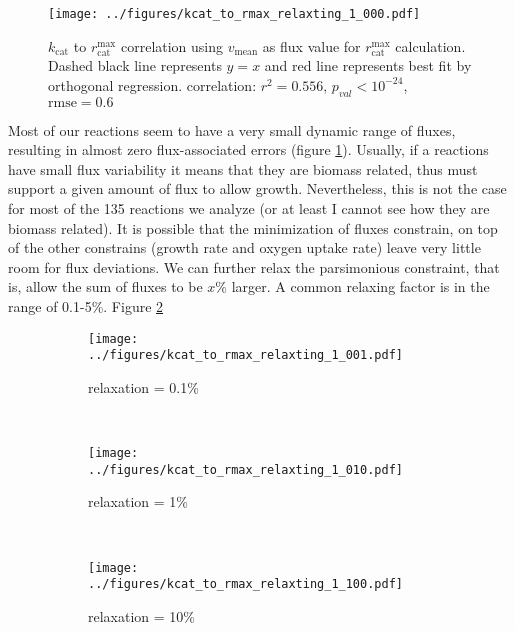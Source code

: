 \documentclass{article}
\newcommand{\kcat}{$k_\mathrm{cat}$ }
\newcommand{\rmax}{$r_\mathrm{cat}^\mathrm{max}$ }
\begin{document}
\begin{figure}
	\center
	\texttt{[image: ../figures/kcat\_to\_rmax\_relaxting\_1\_000.pdf]}
	\caption{\kcat to \rmax correlation using $v_\mathrm{mean}$ as flux value for \rmax calculation. Dashed black line 	represents $y=x$ and red line represents best fit by orthogonal regression. correlation: $r^2 = 0.556$, $p_{val} < 10^{-24}$, $\mathrm{rmse} = 0.6$}
	\label{fig:pFVA}
\end{figure}

Most of our reactions seem to have a very small dynamic range of fluxes, resulting in almost zero flux-associated errors (figure \ref{fig:pFVA}). Usually, if a reactions have small flux variability it means that they are biomass related, thus must support a given amount of flux to allow growth. Nevertheless, this is not the case for most of the 135 reactions we analyze (or at least I cannot see how they are biomass related). It is possible that the minimization of fluxes constrain, on top of the other constrains (growth rate and oxygen uptake rate) leave very little room for flux deviations. We can further relax the parsimonious constraint, that is, allow the sum of fluxes to be $x\%$ larger. A common relaxing factor is in the range of 0.1-5\%. Figure \ref{fig:relax} 

\begin{figure}
        \center
        \begin{subfigure}[b]{0.3\textwidth}
                \texttt{[image: ../figures/kcat\_to\_rmax\_relaxting\_1\_001.pdf]}
                \caption{relaxation = 0.1\%}
        \end{subfigure}%
        ~ %
        \begin{subfigure}[b]{0.3\textwidth}
                \texttt{[image: ../figures/kcat\_to\_rmax\_relaxting\_1\_010.pdf]}
                \caption{relaxation = 1\%}
        \end{subfigure}
        ~ %
        \begin{subfigure}[b]{0.3\textwidth}
                \texttt{[image: ../figures/kcat\_to\_rmax\_relaxting\_1\_100.pdf]}
                \caption{relaxation = 10\%}
        \end{subfigure}
	\caption{}
	\label{fig:relax}	
\end{figure}
\end{document}
